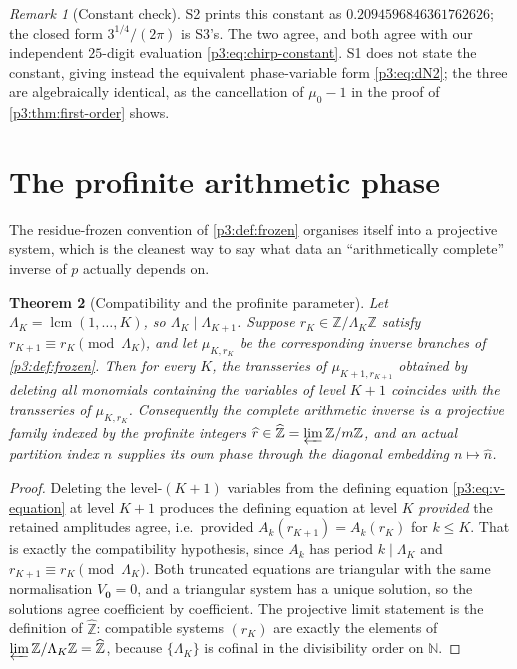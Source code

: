 \documentclass[11pt,a4paper,oneside]{book}
\theoremstyle{plain}
\newtheorem{theorem}{Theorem}[chapter]
\theoremstyle{definition}
\theoremstyle{remark}
\newtheorem{remark}[theorem]{Remark}
\newcommand{\Nat}{\mathbb{N}}
\newcommand{\Int}{\mathbb{Z}}
\begin{document}
\begin{remark}[Constant check]
S2 prints this constant as $0.2094596846361762626$; the closed form $3^{1/4}/(2\pi)$ is S3's. The
two agree, and both agree with our independent $25$-digit evaluation \cref{p3:eq:chirp-constant}.
S1 does not state the constant, giving instead the equivalent phase-variable form
\cref{p3:eq:dN2}; the three are algebraically identical, as the cancellation of $\mu_{0}-1$ in the
proof of \cref{p3:thm:first-order} shows.
\end{remark}

\section{The profinite arithmetic phase}\label{p3:sec:profinite}

The residue-frozen convention of \cref{p3:def:frozen} organises itself into a projective system,
which is the cleanest way to say what data an ``arithmetically complete'' inverse of $p$ actually
depends on.

\begin{theorem}[Compatibility and the profinite parameter]\label{p3:thm:profinite}
Let $\Lambda_{K}=\operatorname{lcm}(1,\dots,K)$, so $\Lambda_{K}\mid\Lambda_{K+1}$. Suppose
$r_{K}\in\Int/\Lambda_{K}\Int$ satisfy $r_{K+1}\equiv r_{K} \pmod{\Lambda_{K}}$, and let
$\mu_{K,r_{K}}$ be the corresponding inverse branches of \cref{p3:def:frozen}. Then for every $K$,
the transseries of $\mu_{K+1,r_{K+1}}$ obtained by deleting all monomials containing the variables
of level $K+1$ coincides with the transseries of $\mu_{K,r_{K}}$. Consequently the complete
arithmetic inverse is a projective family indexed by the profinite integers $\widehat
r\in\widehat{\Int}=\varprojlim\Int/m\Int$, and an actual partition index $n$ supplies its own
phase through the diagonal embedding $n\mapsto\widehat n$.
\end{theorem}

\begin{proof}
Deleting the level-$(K+1)$ variables from the defining equation \cref{p3:eq:v-equation} at level
$K+1$ produces the defining equation at level $K$ \emph{provided} the retained amplitudes agree,
i.e.\ provided $A_{k}(r_{K+1})=A_{k}(r_{K})$ for $k\le K$. That is exactly the compatibility
hypothesis, since $A_{k}$ has period $k\mid\Lambda_{K}$ and $r_{K+1}\equiv
r_{K}\pmod{\Lambda_{K}}$. Both truncated equations are triangular with the same normalisation
$V_{\boldsymbol0}=0$, and a triangular system has a unique solution, so the solutions agree
coefficient by coefficient. The projective limit statement is the definition of $\widehat{\Int}$:
compatible systems $(r_{K})$ are exactly the elements of
$\varprojlim\Int/\Lambda_{K}\Int=\widehat{\Int}$, because $\{\Lambda_{K}\}$ is cofinal in the
divisibility order on $\Nat$.
\end{proof}
\end{document}
